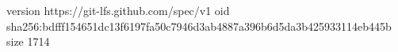 version https://git-lfs.github.com/spec/v1
oid sha256:bdfff154651dc13f6197fa50c7946d3ab4887a396b6d5da3b425933114eb445b
size 1714
